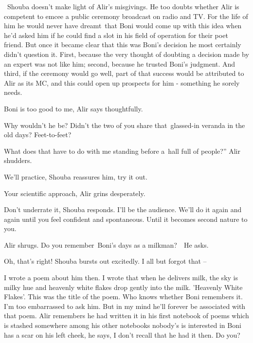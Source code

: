 \documentclass[twoside,11pt]{book}
\begin{document}
~Shouba doesn't make light of Alir's misgivings. He too doubts whether Alir is competent to emcee a public ceremony
broadcast on radio and TV. For the life of him he would never have dreamt~that Boni would come up with this idea when
he'd asked him if he could find a slot in his field of operation for their poet friend. But once it became clear that
this was Boni's decision he most certainly didn't question it. First, because the very thought of doubting a decision
made by an expert was not like him; second, because he trusted Boni's judgment. And third, if the ceremony would go
well, part of that success would be attributed to Alir as its MC, and this could open up prospects for him - something
he sorely needs.

{\textquotedbl}Boni is too good to me,{\textquotedbl} Alir says thoughtfully.

{\textquotedbl}Why wouldn't he be? Didn't the two of you share that\ glassed-in veranda in the old days?
Feet-to-feet?{\textquotedbl}

{\textquotedbl}What does that have to do with me standing before a~hall full of people?'' Alir shudders. 

{\textquotedbl}We'll practice,{\textquotedbl} Shouba reassures him, {\textquotedbl}try it out.{\textquotedbl} 

{\textquotedbl}Your scientific approach,{\textquotedbl} Alir grins desperately. 

{\textquotedbl}Don't underrate it,{\textquotedbl} Shouba responds. {\textquotedbl}I'll be the audience. We'll do it
again and again until you feel confident and spontaneous. Until it becomes second nature to you.{\textquotedbl} 

Alir shrugs. {\textquotedbl}Do you remember~Boni's days as a milkman?{\textquotedbl}\ \ He asks. 

{\textquotedbl}Oh, that's right!{\textquotedbl} Shouba bursts out excitedly. {\textquotedbl}I all but forgot that
--{\textquotedbl}

{\textquotedbl}I wrote a poem about him then. I wrote that when he delivers milk, the sky is milky hue and heavenly
white flakes drop gently into the milk. 'Heavenly White Flakes'. This was the title of the poem. Who knows whether Boni
remembers it. I'm too embarrassed to ask him. But in my mind he'll forever be associated with that poem.{\textquotedbl}
Alir remembers he had written it in his first notebook of poems which is stashed somewhere among his other notebooks
nobody's is interested in {\textquotedbl}Boni has a scar on his left cheek,{\textquotedbl} he says, {\textquotedbl}I
don't recall that he had it then. Do you?{\textquotedbl}\ \ 
\end{document}
